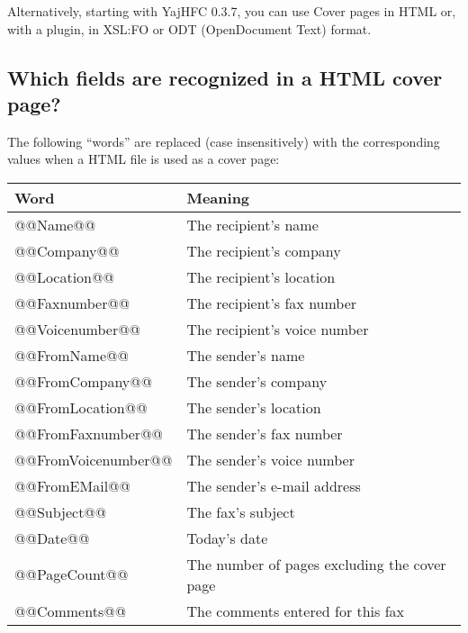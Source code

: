 \documentclass[a4paper,10pt]{scrartcl}
\begin{document}
Alternatively, starting with YajHFC 0.3.7, you can use Cover pages in HTML or, with a plugin, in XSL:FO or ODT (OpenDocument Text) format.

\subsection{Which fields are recognized in a HTML cover page?}

The following ``words'' are replaced (case insensitively) with the corresponding values when a HTML file is used as a cover page:

\begin{center}
\begin{tabular}{|l|l|}
\hline
\bfseries Word & \bfseries Meaning \\
\hline\hline
\ttfamily @@Name@@ & The recipient's name \\\hline
\ttfamily @@Company@@ & The recipient's company \\\hline
\ttfamily @@Location@@ & The recipient's location \\\hline
\ttfamily @@Faxnumber@@ & The recipient's fax number \\\hline
\ttfamily @@Voicenumber@@ & The recipient's voice number \\\hline
\ttfamily @@FromName@@ & The sender's name \\\hline
\ttfamily @@FromCompany@@ & The sender's company \\\hline
\ttfamily @@FromLocation@@ & The sender's location \\\hline
\ttfamily @@FromFaxnumber@@ & The sender's fax number \\\hline
\ttfamily @@FromVoicenumber@@ & The sender's voice number \\\hline
\ttfamily @@FromEMail@@ & The sender's e-mail address \\\hline
\ttfamily @@Subject@@ & The fax's subject \\\hline
\ttfamily @@Date@@ & Today's date \\\hline
\ttfamily @@PageCount@@ & The number of pages excluding the cover page \\\hline
\ttfamily @@Comments@@ & The comments entered for this fax \\\hline
\end{tabular}
\end{center}
\end{document}
